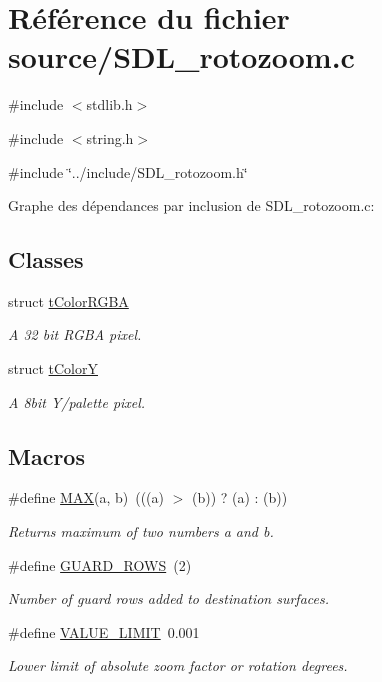 \hypertarget{a00044}{
\section{Référence du fichier source/SDL\_\-rotozoom.c}
\label{a00044}
}
{\ttfamily \#include $<$stdlib.h$>$}\par
{\ttfamily \#include $<$string.h$>$}\par
{\ttfamily \#include \char`\"{}../include/SDL\_\-rotozoom.h\char`\"{}}\par
Graphe des dépendances par inclusion de SDL\_\-rotozoom.c:
\subsection*{Classes}
\begin{DoxyCompactItemize}
\item 
struct \hyperlink{a00015}{tColorRGBA}
\begin{DoxyCompactList}\small\item\em A 32 bit RGBA pixel. \end{DoxyCompactList}\item 
struct \hyperlink{a00016}{tColorY}
\begin{DoxyCompactList}\small\item\em A 8bit Y/palette pixel. \end{DoxyCompactList}\end{DoxyCompactItemize}
\subsection*{Macros}
\begin{DoxyCompactItemize}
\item 
\#define \hyperlink{a00044_afa99ec4acc4ecb2dc3c2d05da15d0e3f}{MAX}(a, b)~(((a) $>$ (b)) ? (a) : (b))
\begin{DoxyCompactList}\small\item\em Returns maximum of two numbers a and b. \end{DoxyCompactList}\item 
\#define \hyperlink{a00044_a05a2601b7ea2906858ccc31b45fdc6eb}{GUARD\_\-ROWS}~(2)
\begin{DoxyCompactList}\small\item\em Number of guard rows added to destination surfaces. \end{DoxyCompactList}\item 
\#define \hyperlink{a00044_a98a929bd64d660c1860c7b60b4fe5bd9}{VALUE\_\-LIMIT}~0.001
\begin{DoxyCompactList}\small\item\em Lower limit of absolute zoom factor or rotation degrees. \end{DoxyCompactList}\end{DoxyCompactItemize}
